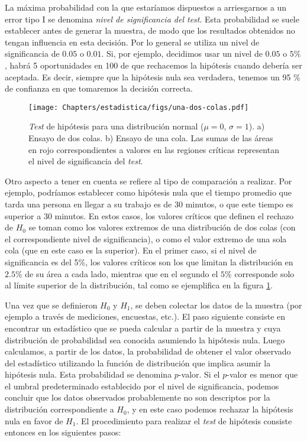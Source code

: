La máxima probabilidad con la que estaríamos dispuestos a arriesgarnos a un error tipo I se denomina \textit{nivel de significancia del test}. Esta probabilidad se suele establecer antes de generar la muestra, de modo que los resultados obtenidos no tengan influencia en esta decisión. Por lo general se utiliza un nivel de significancia de $0.05$ o $0.01$. Si, por ejemplo, decidimos usar un nivel de $0.05$ o $5\%$, habrá 5 oportunidades en 100 de que rechacemos la hipótesis cuando debería ser aceptada. Es decir, siempre que la hipótesis nula sea verdadera, tenemos un 95 \% de confianza en que tomaremos la decisión correcta. 

\begin{figure}[t]
 \centering
 \texttt{[image: Chapters/estadistica/figs/una-dos-colas.pdf]}
 \caption{\textit{Test} de hipótesis para una distribución normal ($\mu = 0$, $\sigma = 1$). a) Ensayo de dos colas. b) Ensayo de una cola. Las sumas de las áreas en rojo correspondientes a valores en las regiones críticas representan el nivel de significancia del \textit{test}.}
 \label{fig:estad01b}
\end{figure}

Otro aspecto a tener en cuenta se refiere al tipo de comparación a realizar. Por ejemplo, podríamos establecer como hipótesis nula que el tiempo promedio que tarda una persona en llegar a su trabajo es de 30 minutos, o que este tiempo es superior a 30 minutos. En estos casos, los valores críticos que definen el rechazo de $H_0$ se toman como los valores extremos de una distribución de dos colas (con el correspondiente nivel de significancia), o como el valor extremo de una sola cola (que en este caso es la superior). En el primer caso, si el nivel de significancia es del 5\%, los valores críticos son los que limitan la distribución en $2.5$\% de su área a cada lado, mientras que en el segundo el $5$\% corresponde solo al límite superior de la distribución, tal como se ejemplifica en la figura \ref{fig:estad01b}.

Una vez que se definieron $H_0$ y $H_1$, se deben colectar los datos de la muestra (por ejemplo a través de mediciones, encuestas, etc.). El paso siguiente consiste en encontrar un estadístico que se pueda calcular a partir de la muestra y cuya distribución de probabilidad sea conocida asumiendo la hipótesis nula. Luego calculamos, a partir de los datos, la probabilidad de obtener el valor observado del estadístico utilizando la función de distribución que implica asumir la hipótesis nula. Esta probabilidad se denomina $p$-valor. Si el $p$-valor es menor que el umbral predeterminado establecido por el nivel de significancia, podemos concluir que los datos observados probablemente no son descriptos por la distribución correspondiente a $H_0$, y en este caso podemos rechazar la hipótesis nula en favor de $H_1$. El procedimiento para realizar el \textit{test} de hipótesis consiste entonces en los siguientes pasos:


